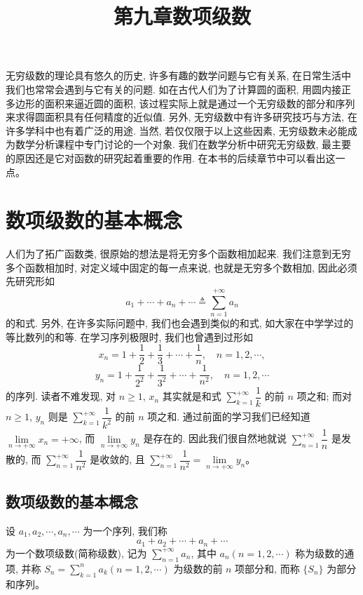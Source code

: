 \documentclass[UTF8, 12pt, fontset=fandol, oneside]{ctexart}
\title{第九章\quad 数项级数}
\author{}
\date{}
\begin{document}
\maketitle

无穷级数的理论具有悠久的历史, 许多有趣的数学问题与它有关系, 在日常生活中我们也常常会遇到与它有关的问题. 如在古代人们为了计算圆的面积, 用圆内接正多边形的面积来逼近圆的面积, 该过程实际上就是通过一个无穷级数的部分和序列来求得圆面积具有任何精度的近似值. 另外, 无穷级数中有许多研究技巧与方法, 在许多学科中也有着广泛的用途. 当然, 若仅仅限于以上这些因素, 无穷级数未必能成为数学分析课程中专门讨论的一个对象. 我们在数学分析中研究无穷级数, 最主要的原因还是它对函数的研究起着重要的作用. 在本书的后续章节中可以看出这一点。

\section{数项级数的基本概念}

人们为了拓广函数类, 很原始的想法是将无穷多个函数相加起来. 我们注意到无穷多个函数相加时, 对定义域中固定的每一点来说, 也就是无穷多个数相加, 因此必须先研究形如
\begin{equation}
  a_1+\cdots+a_n+\cdots\triangleq \sum_{n=1}^{+\infty}a_n
  \tag{9.1.1}
\end{equation}
的和式. 另外, 在许多实际问题中, 我们也会遇到类似的和式, 如大家在中学学过的等比数列的和等. 在学习序列极限时, 我们也曾遇到过形如
\[
  x_n=1+\frac12+\frac13+\cdots+\frac1n,\quad n=1,2,\cdots,
\]
\[
  y_n=1+\frac1{2^2}+\frac1{3^2}+\cdots+\frac1{n^2},\quad n=1,2,\cdots
\]
的序列. 读者不难发现, 对 $n\geq1$, $x_n$ 其实就是和式 $\sum\limits_{k=1}^{+\infty}\dfrac1k$ 的前 $n$ 项之和; 而对 $n\geq1$, $y_n$ 则是 $\sum\limits_{k=1}^{+\infty}\dfrac1{k^2}$ 的前 $n$ 项之和. 通过前面的学习我们已经知道 $\lim\limits_{n\to+\infty}x_n=+\infty$, 而 $\lim\limits_{n\to+\infty}y_n$ 是存在的. 因此我们很自然地就说 $\sum\limits_{n=1}^{+\infty}\dfrac1n$ 是发散的, 而 $\sum\limits_{n=1}^{+\infty}\dfrac1{n^2}$ 是收敛的, 且 $\sum\limits_{n=1}^{+\infty}\dfrac1{n^2}=\lim\limits_{n\to+\infty}y_n$。

\subsection{数项级数的基本概念}

设 $a_1,a_2,\cdots,a_n,\cdots$ 为一个序列, 我们称
\[
  a_1+a_2+\cdots+a_n+\cdots
\]
为一个数项级数(简称级数), 记为 $\sum\limits_{n=1}^{+\infty}a_n$, 其中 $a_n(n=1,2,\cdots)$ 称为级数的通项, 并称 $S_n=\sum\limits_{k=1}^n a_k(n=1,2,\cdots)$ 为级数的前 $n$ 项部分和, 而称 $\{S_n\}$ 为部分和序列。
\end{document}
